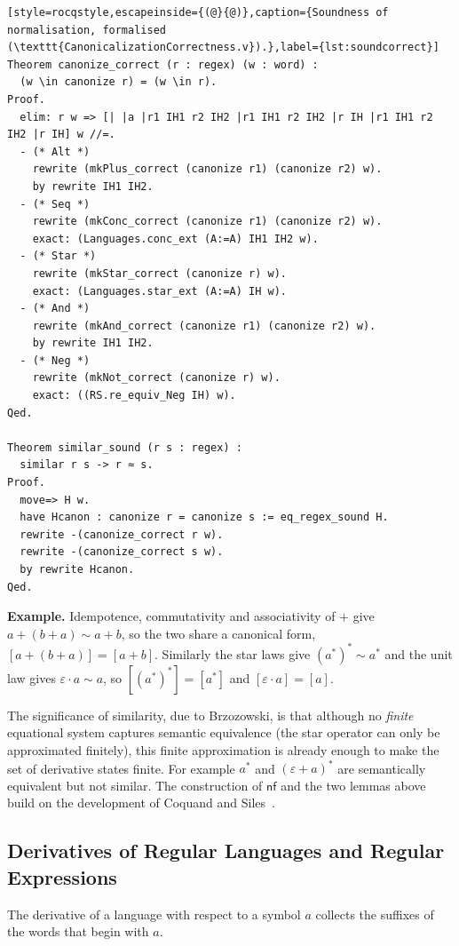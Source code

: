 \begin{lstlisting}[style=rocqstyle,escapeinside={(@}{@)},caption={Soundness of normalisation, formalised (\texttt{CanonicalizationCorrectness.v}).},label={lst:soundcorrect}]
Theorem canonize_correct (r : regex) (w : word) :
  (w \in canonize r) = (w \in r).
Proof.
  elim: r w => [| |a |r1 IH1 r2 IH2 |r1 IH1 r2 IH2 |r IH |r1 IH1 r2 IH2 |r IH] w //=.
  - (* Alt *)
    rewrite (mkPlus_correct (canonize r1) (canonize r2) w).
    by rewrite IH1 IH2.
  - (* Seq *)
    rewrite (mkConc_correct (canonize r1) (canonize r2) w).
    exact: (Languages.conc_ext (A:=A) IH1 IH2 w).
  - (* Star *)
    rewrite (mkStar_correct (canonize r) w).
    exact: (Languages.star_ext (A:=A) IH w).
  - (* And *)
    rewrite (mkAnd_correct (canonize r1) (canonize r2) w).
    by rewrite IH1 IH2.
  - (* Neg *)
    rewrite (mkNot_correct (canonize r) w).
    exact: ((RS.re_equiv_Neg IH) w).
Qed.

Theorem similar_sound (r s : regex) :
  similar r s -> r ≈ s.
Proof.
  move=> H w.
  have Hcanon : canonize r = canonize s := eq_regex_sound H.
  rewrite -(canonize_correct r w).
  rewrite -(canonize_correct s w).
  by rewrite Hcanon.
Qed.
\end{lstlisting}

\noindent\textbf{Example.} Idempotence, commutativity and associativity of $+$ give
$a+(b+a)\sim a+b$, so the two share a canonical form, $[a+(b+a)]=[a+b]$. Similarly
the star laws give $(a^{*})^{*}\sim a^{*}$ and the unit law gives
$\varepsilon\cdot a\sim a$, so $[(a^{*})^{*}]=[a^{*}]$ and $[\varepsilon\cdot a]=[a]$.

\medskip
The significance of similarity, due to Brzozowski, is that although no
\emph{finite} equational system captures semantic equivalence (the star operator
can only be approximated finitely), this finite approximation is already enough to
make the set of derivative states finite. For example $a^{*}$ and
$(\varepsilon+a)^{*}$ are semantically equivalent but not similar. The construction
of $\mathsf{nf}$ and the two lemmas above build on the development of Coquand and
Siles~\cite{CoquandRegexEquality}.

\subsection{Derivatives of Regular Languages and Regular Expressions}
\label{sec:crisp-derivatives}

The derivative of a language with respect to a symbol $a$ collects the suffixes of
the words that begin with $a$.

